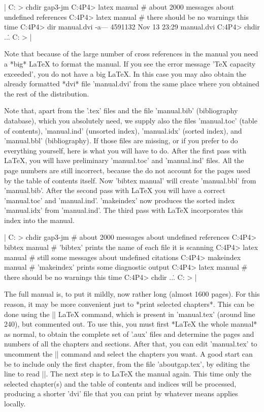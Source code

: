 |    C: > chdir gap3-jm\doc
    C:\GAPR4P4\DOC > latex manual
    # about 2000 messages about undefined references
    C:\GAPR4P4\DOC > latex manual
    # there should be no warnings this time
    C:\GAPR4P4\DOC > dir manual.dvi
    -a---   4591132 Nov 13 23:29 manual.dvi
    C:\GAPR4P4\DOC > chdir ..\..
    C: > |

Note that because of the large  number of  cross references in the manual
you need a *big*  {\LaTeX} to format the {\GAP}  manual.  If you  see the
error message  'TeX capacity  exceeded', you do  not have a big {\LaTeX}.
In this case  you  may also  obtain the  already    formatted *dvi*  file
'manual.dvi' from  the  same place where   you obtained the   rest of the
{\GAP} distribution.

Note that, apart   from   the  '\*.tex' files  and the file  'manual.bib'
(bibliography database),  which you absolutely need, we  supply  also the
files 'manual.toc' (table of   contents), 'manual.ind' (unsorted  index),
'manual.idx' (sorted  index), and  'manual.bbl' (bibliography).  If those
files are missing, or  if you prefer  to do everything  yourself, here is
what you will have to do.  After  the first  pass with {\LaTeX}, you will
have  preliminary 'manual.toc' and  'manual.ind'  files.   All  the  page
numbers are  still incorrect, because the  do not account  for  the pages
used by  the table of contents itself.   Now 'bibtex  manual' will create
'manual.bbl' from 'manual.bib'.  After  the second pass with {\LaTeX} you
will  have a  correct   'manual.toc'  and 'manual.ind'.  'makeindex'  now
produces the sorted index 'manual.idx' from 'manual.ind'.  The third pass
with {\LaTeX} incorporates this index into the manual.

|    C: > chdir gap3-jm\doc
    # about 2000 messages about undefined references
    C:\GAPR4P4\DOC > bibtex manual
    # 'bibtex' prints the name of each file it is scanning
    C:\GAPR4P4\DOC > latex manual
    # still some messages about undefined citations
    C:\GAPR4P4\DOC > makeindex manual
    # 'makeindex' prints some diagnostic output
    C:\GAPR4P4\DOC > latex manual
    # there should be no warnings this time
    C:\GAPR4P4\DOC > chdir ..\..
    C: > |

The full   manual is, to put  it  mildly,  now  rather long  (almost 1600
pages).  For  this  reason, it  may  be  more convenient   just to *print
selected  chapters*. This can  be  done  using  the  || LaTeX
command,  which  is  present in    'manual.tex'  (around line 240),   but
commented out. To use  this, you must first  *LaTeX the whole  manual* as
normal, to  obtain  the complete set of   '.aux' files and determine  the
pages and numbers of  all the chapters  and sections. After that, you can
edit 'manual.tex' to uncomment  the || command and select the
chapters you want. A good start can be to include only the first chapter,
from  the    file  'aboutgap.tex',   by     editing the  line   to   read
||.  The  next step is  to LaTeX  the manual again.
This time only the   selected chapter(s) and  the  table of contents  and
indices will be  processed, producing a  shorter 'dvi' file  that you can
print by whatever means applies locally.

